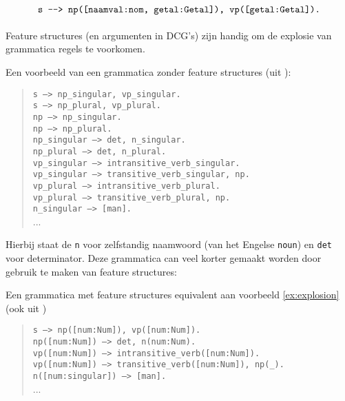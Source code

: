 \[
    \texttt{s ---> np([naamval:nom, getal:Getal]), vp([getal:Getal]).} \\
\]

\paragraph{} Feature structures (en argumenten in DCG's) zijn handig om de explosie van grammatica regels te voorkomen.
\begin{ex}  Een voorbeeld van een grammatica zonder feature structures (uit \cite{NLPCourse}):
  \label{ex:explosion}
  \begin{quote}
    \texttt{s ---> np\_{singular}, vp\_{singular}.} \\
    \texttt{s ---> np\_{plural}, vp\_{plural}.} \\
    \texttt{np ---> np\_{singular}.} \\
    \texttt{np ---> np\_{plural}.} \\
    \texttt{np\_{singular} ---> det, n\_{singular}.} \\
    \texttt{np\_{plural} ---> det, n\_{plural}.} \\
    \texttt{vp\_{singular} ---> intransitive\_verb\_{singular}.} \\
    \texttt{vp\_{singular} ---> transitive\_verb\_{singular}, np.} \\
    \texttt{vp\_{plural} ---> intransitive\_verb\_{plural}.} \\
    \texttt{vp\_{plural} ---> transitive\_verb\_{plural}, np.} \\
    \texttt{n\_singular ---> [man].} \\
    ...
  \end{quote}
\end{ex} 
Hierbij staat de \texttt{n} voor zelfstandig naamwoord (van het Engelse \texttt{noun}) en \texttt{det} voor determinator. Deze grammatica can veel korter gemaakt worden door gebruik te maken van feature structures:

\begin{ex}  Een grammatica met feature structures equivalent aan voorbeeld \ref{ex:explosion} (ook uit \cite{NLPCourse})
  \begin{quote}
    \texttt{s ---> np([num:Num]), vp([num:Num]).} \\
    \texttt{np([num:Num]) ---> det, n(num:Num).} \\
    \texttt{vp([num:Num]) ---> intransitive\_verb([num:Num]).} \\
    \texttt{vp([num:Num]) ---> transitive\_verb([num:Num]), np(\_).} \\
    \texttt{n([num:singular]) ---> [man].} \\
    ...
  \end{quote}
\end{ex} 

